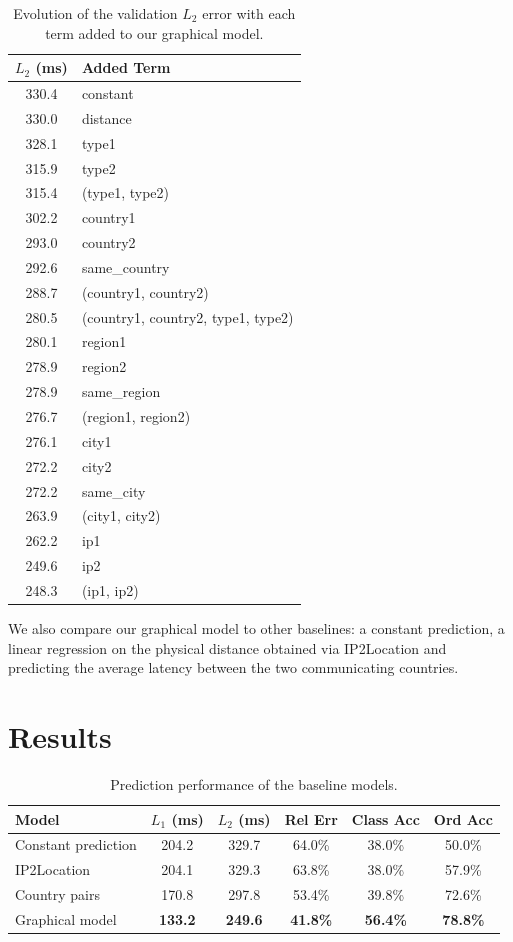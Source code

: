 \documentclass[10pt,a4paper,notitlepage,twocolumn]{article}
\begin{document}
\begin{table}
\centering
\begin{tabular}{|cl|}
\hline $L_2$ (ms) & Added Term \\ \hline\hline
330.4 & constant \\
330.0 & distance \\
328.1 & type1 \\
315.9 & type2 \\
315.4 & (type1, type2) \\
302.2 & country1 \\
293.0 & country2 \\
292.6 & same\_country \\
288.7 & (country1, country2) \\
280.5 & (country1, country2, type1, type2) \\
280.1 & region1 \\
278.9 & region2 \\
278.9 & same\_region \\
276.7 & (region1, region2) \\
276.1 & city1 \\
272.2 & city2 \\
272.2 & same\_city \\
263.9 & (city1, city2) \\
262.2 & ip1 \\
249.6 & ip2 \\
248.3 & (ip1, ip2) \\
\hline 
\end{tabular} 
\caption{Evolution of the validation $L_2$ error with each term added to our graphical model.}
\label{tab:terms}
\end{table}


We also compare our graphical model to other baselines: a constant prediction, a linear regression on the physical distance obtained via IP2Location and predicting the average latency between the two communicating countries.


\section{Results}


\begin{table}[!ht]
\centering
\begin{tabular}{|l|c|c|c|c|c|}
\hline Model & $L_1$ (ms)  & $L_2$ (ms) & Rel Err & Class Acc & Ord Acc \\ \hline\hline
Constant prediction & 204.2 & 329.7 & 64.0\% & 38.0\% & 50.0\% \\
IP2Location & 204.1 & 329.3 & 63.8\% & 38.0\% & 57.9\% \\
Country pairs & 170.8 & 297.8 & 53.4\% & 39.8\% & 72.6\% \\ 
Graphical model & \bf 133.2 & \bf 249.6 & \bf 41.8\% & \bf 56.4\% & \bf 78.8\% \\ \hline 
\end{tabular} 
\caption{Prediction performance of the baseline models.}
\label{tab:comp}
\end{table}
\end{document}
